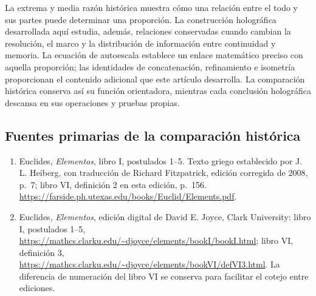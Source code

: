 La extrema y media razón histórica muestra cómo una relación entre el todo
y sus partes puede determinar una proporción. La construcción holográfica
desarrollada aquí estudia, además, relaciones conservadas cuando cambian la
resolución, el marco y la distribución de información entre continuidad y
memoria. La ecuación de autoescala establece un enlace matemático preciso
con aquella proporción; las identidades de concatenación, refinamiento e
isometría proporcionan el contenido adicional que este artículo desarrolla.
La comparación histórica conserva así su función orientadora, mientras
cada conclusión holográfica descansa en sus operaciones y pruebas propias.

\subsection*{Fuentes primarias de la comparación histórica}

\begin{enumerate}[label=\arabic*.]
 \item Euclides, \emph{Elementos}, libro I, postulados 1--5. Texto
 griego establecido por J. L. Heiberg, con traducción de Richard Fitzpatrick,
 edición corregida de 2008, p.~7; libro VI, definición 2 en esta edición,
 p.~156. \url{https://farside.ph.utexas.edu/books/Euclid/Elements.pdf}.
 \item Euclides, \emph{Elementos}, edición digital de David E. Joyce,
 Clark University: libro I, postulados 1--5,
 \url{https://mathcs.clarku.edu/~djoyce/elements/bookI/bookI.html};
 libro VI, definición 3,
 \url{https://mathcs.clarku.edu/~djoyce/elements/bookVI/defVI3.html}.
 La diferencia de numeración del libro VI se conserva para facilitar el
 cotejo entre ediciones.
\end{enumerate}
